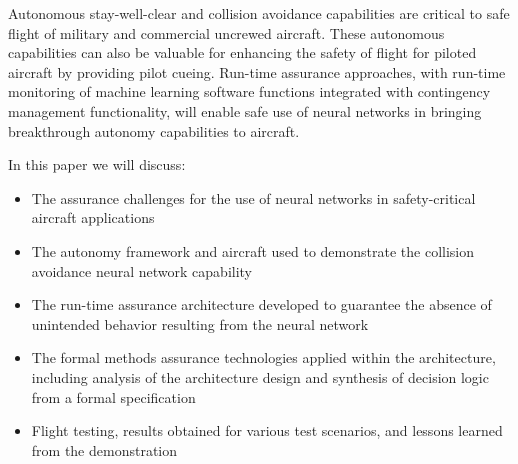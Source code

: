 Autonomous stay-well-clear and collision avoidance capabilities are critical to safe flight of
military and commercial uncrewed aircraft. These autonomous capabilities can also be valuable for
enhancing the safety of flight for piloted aircraft by providing pilot cueing. Run-time assurance
approaches, with run-time monitoring of machine learning software functions integrated with
contingency management functionality, will enable safe use of neural networks in bringing
breakthrough autonomy capabilities to aircraft.

In this paper we will discuss: 
\begin{itemize} 
\item The assurance challenges for the use of neural networks in safety-critical aircraft applications 
\item The autonomy framework and aircraft used to demonstrate the collision avoidance neural network capability 
\item The run-time assurance architecture developed to guarantee the absence of unintended behavior resulting from the neural network 
\item The formal methods assurance technologies applied within the architecture, including analysis of the architecture design and synthesis of decision logic from a formal specification
\item Flight testing, results obtained for various test scenarios, and lessons learned from the
demonstration
\end{itemize}
